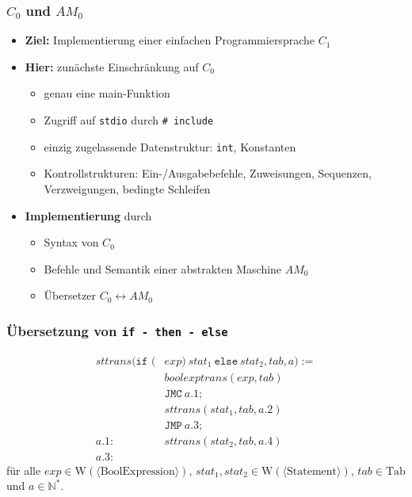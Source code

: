 \documentclass[aspectratio=1610,onlymath, ngerman]{beamer}
\renewcommand{\emph}[1]{\textbf{#1}}
\begin{document}
    \maketitle
    
    \begin{frame} \frametitle{$C_0$ und $AM_0$}
    \small
    	\begin{itemize}
    		\item \emph{Ziel:} Implementierung einer einfachen Programmiersprache $C_1$
    		\item \emph{Hier:} zunächste Einschränkung auf $C_0$ \pause
    			\begin{itemize}
    				\item genau eine main-Funktion
    				\item Zugriff auf \texttt{stdio} durch \texttt{\# include}
    				\item einzig zugelassende Datenstruktur: \texttt{int}, Konstanten
    				\item Kontrollstrukturen: Ein-/Ausgabebefehle, Zuweisungen, Sequenzen, Verzweigungen, bedingte Schleifen
    			\end{itemize}
    		\pause
    		\item \emph{Implementierung} durch
    			\begin{itemize}
    				\item Syntax von $C_0$
    				\item Befehle und Semantik einer abstrakten Maschine $AM_0$
    				\item Übersetzer $C_0 \leftrightarrow AM_0$
    			\end{itemize}
    	\end{itemize}
    \end{frame}

	\begin{frame} \frametitle{Übersetzung von \texttt{if - then - else}}
	\small \centering
	\begin{align*}
		sttrans( \texttt{if (} &exp \texttt{)} \ stat_1 \ \texttt{else} \ stat_2, tab, a) := \\
		& boolexptrans(exp, tab) \\
		&\texttt{JMC} \ a.1 ; \\
		& sttrans(stat_1, tab, a.2) \\
		&\texttt{JMP} \ a.3; \\
		a.1: \quad & sttrans(stat_2, tab, a.4) \\
		a.3: \quad & \phantom{.}
	\end{align*}
	für alle $exp \in \mathrm{W}(\langle \mathrm{BoolExpression} \rangle )$, $stat_1, stat_2 \in \mathrm{W}(\langle \mathrm{Statement} \rangle )$, $tab \in \mathrm{Tab}$ und $a \in \mathbb{N}^\ast$.
	\end{frame}
\end{document}
